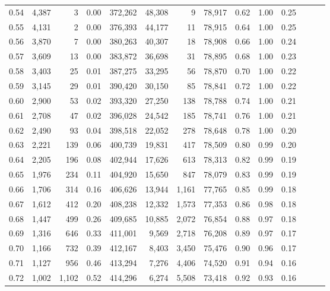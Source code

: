 \begin{tabular}{rrrrrrrrrrrrrr}
0.54 &  4,387 &      3 &  0.00 &  372,262 &   48,308 &       9 &  78,917 &  0.62 &  1.00 &      0.25 \\
0.55 &  4,131 &      2 &  0.00 &  376,393 &   44,177 &      11 &  78,915 &  0.64 &  1.00 &      0.25 \\
0.56 &  3,870 &      7 &  0.00 &  380,263 &   40,307 &      18 &  78,908 &  0.66 &  1.00 &      0.24 \\
0.57 &  3,609 &     13 &  0.00 &  383,872 &   36,698 &      31 &  78,895 &  0.68 &  1.00 &      0.23 \\
0.58 &  3,403 &     25 &  0.01 &  387,275 &   33,295 &      56 &  78,870 &  0.70 &  1.00 &      0.22 \\
0.59 &  3,145 &     29 &  0.01 &  390,420 &   30,150 &      85 &  78,841 &  0.72 &  1.00 &      0.22 \\
0.60 &  2,900 &     53 &  0.02 &  393,320 &   27,250 &     138 &  78,788 &  0.74 &  1.00 &      0.21 \\
0.61 &  2,708 &     47 &  0.02 &  396,028 &   24,542 &     185 &  78,741 &  0.76 &  1.00 &      0.21 \\
0.62 &  2,490 &     93 &  0.04 &  398,518 &   22,052 &     278 &  78,648 &  0.78 &  1.00 &      0.20 \\
0.63 &  2,221 &    139 &  0.06 &  400,739 &   19,831 &     417 &  78,509 &  0.80 &  0.99 &      0.20 \\
0.64 &  2,205 &    196 &  0.08 &  402,944 &   17,626 &     613 &  78,313 &  0.82 &  0.99 &      0.19 \\
0.65 &  1,976 &    234 &  0.11 &  404,920 &   15,650 &     847 &  78,079 &  0.83 &  0.99 &      0.19 \\
0.66 &  1,706 &    314 &  0.16 &  406,626 &   13,944 &   1,161 &  77,765 &  0.85 &  0.99 &      0.18 \\
0.67 &  1,612 &    412 &  0.20 &  408,238 &   12,332 &   1,573 &  77,353 &  0.86 &  0.98 &      0.18 \\
0.68 &  1,447 &    499 &  0.26 &  409,685 &   10,885 &   2,072 &  76,854 &  0.88 &  0.97 &      0.18 \\
0.69 &  1,316 &    646 &  0.33 &  411,001 &    9,569 &   2,718 &  76,208 &  0.89 &  0.97 &      0.17 \\
0.70 &  1,166 &    732 &  0.39 &  412,167 &    8,403 &   3,450 &  75,476 &  0.90 &  0.96 &      0.17 \\
0.71 &  1,127 &    956 &  0.46 &  413,294 &    7,276 &   4,406 &  74,520 &  0.91 &  0.94 &      0.16 \\
0.72 &  1,002 &  1,102 &  0.52 &  414,296 &    6,274 &   5,508 &  73,418 &  0.92 &  0.93 &      0.16 \\

\end{tabular}
